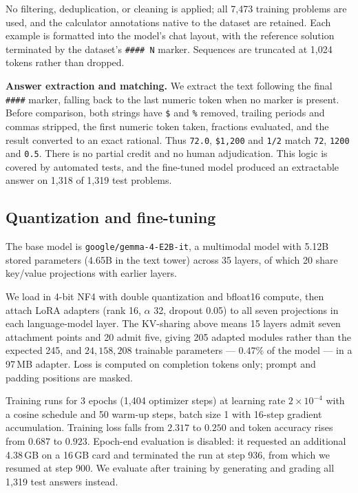\documentclass[conference]{IEEEtran}
\begin{document}
No filtering, deduplication, or cleaning is applied; all 7{,}473 training problems are
used, and the calculator annotations native to the dataset are retained. Each example is
formatted into the model's chat layout, with the reference solution terminated by the
dataset's \verb|#### N| marker. Sequences are truncated at 1{,}024 tokens rather than
dropped.

\textbf{Answer extraction and matching.} We extract the text following the final
\verb|####| marker, falling back to the last numeric token when no marker is present.
Before comparison, both strings have \verb|$| and \verb|%| removed, trailing periods and
commas stripped, the first numeric token taken, fractions evaluated, and the result
converted to an exact rational. Thus \texttt{72.0}, \texttt{\$1,200} and \texttt{1/2}
match \texttt{72}, \texttt{1200} and \texttt{0.5}. There is no partial credit and no human
adjudication. This logic is covered by automated tests, and the fine-tuned model produced
an extractable answer on 1{,}318 of 1{,}319 test problems.

\subsection{Quantization and fine-tuning}

The base model is \texttt{google/gemma-4-E2B-it}, a multimodal model with 5.12B stored
parameters (4.65B in the text tower) across 35 layers, of which 20 share key/value
projections with earlier layers.

We load in 4-bit NF4 with double quantization and bfloat16 compute, then attach LoRA
adapters (rank 16, $\alpha$ 32, dropout 0.05) to all seven projections in each
language-model layer. The KV-sharing above means 15 layers admit seven attachment points
and 20 admit five, giving 205 adapted modules rather than the expected 245, and
$24{,}158{,}208$ trainable parameters --- $0.47\%$ of the model --- in a 97\,MB adapter.
Loss is computed on completion tokens only; prompt and padding positions are masked.

Training runs for 3 epochs (1{,}404 optimizer steps) at learning rate $2\times10^{-4}$
with a cosine schedule and 50 warm-up steps, batch size 1 with 16-step gradient
accumulation. Training loss falls from $2.317$ to $0.250$ and token accuracy rises from
$0.687$ to $0.923$. Epoch-end evaluation is disabled: it requested an additional 4.38\,GB
on a 16\,GB card and terminated the run at step 936, from which we resumed at step 900. We
evaluate after training by generating and grading all 1{,}319 test answers instead.
\end{document}
